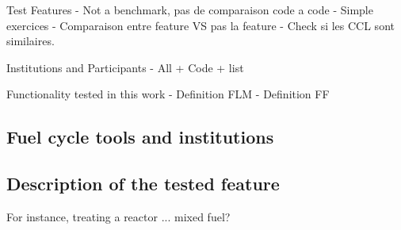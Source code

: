 Test Features
    - Not a benchmark, pas de comparaison code a code
    - Simple exercices
    - Comparaison entre feature VS pas la feature
    - Check si les CCL sont similaires. 
    
Institutions and Participants
    - All + Code + list
    
Functionality tested in this work
    - Definition FLM
    - Definition FF







\subsection{Fuel cycle tools and institutions}



\subsection{Description of the tested feature}


For instance, treating a reactor ... mixed fuel?

